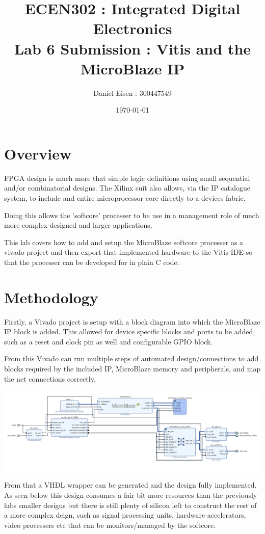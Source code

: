 \documentclass[11pt]{article}
\title{ECEN302 : Integrated Digital Electronics \\ Lab 6 Submission : Vitis and the MicroBlaze IP}
\author{Daniel Eisen : 300447549}
\date{\today}
\begin{document}
\begin{preview}
\maketitle
\section{Overview}
FPGA design is much more that simple logic definitions using small sequential and/or combinatorial designs. The Xilinx suit also allows, via the IP catalogue system, to include and entire microprocessor core directly to a devices fabric.

Doing this allows the 'softcore' processer to be use in a management role of much more complex designed and larger applications.

This lab covers how to add and setup the MicroBlaze softcore processer as a vivado project and then export that implemented hardware to the Vitis IDE so that the processer can be developed for in plain C code.

\section{Methodology}
Firstly, a Vivado project is setup with a block diagram into which the MicroBlaze IP block is added. This allowed for device specific blocks and ports to be added, such as a reset and clock pin as well and configurable GPIO block.

From this Vivado can run multiple steps of automated design/connections to add blocks required by the included IP, MicroBlaze memory and peripherals, and map the net connections correctly. 


\includegraphics[width=\textwidth]{inc/block_design.PNG}

From that a VHDL wrapper can be generated and the design fully implemented. As seen below this design consumes a fair bit more resources than the previously labs smaller designs but there is still plenty of silicon left to construct the rest of a more complex deign, such as signal processing units, hardware accelerators, video processers etc that can be monitors/managed by the softcore.


\end{preview}
\end{document}
